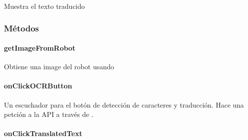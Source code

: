 \begin{fulllineitems}
\label{\detokenize{dev_docs:com.lar.cloudnao.OCRTranslationActivity.mTextTranslatedTV}}
Muestra el texto traducido

\end{fulllineitems}



\subsubsection{Métodos}
\label{\detokenize{dev_docs:id22}}

\paragraph{getImageFromRobot}
\label{\detokenize{dev_docs:id23}}

\begin{fulllineitems}
\label{\detokenize{dev_docs:com.lar.cloudnao.OCRTranslationActivity.getImageFromRobot()}}
Obtiene una image del robot usando 

\end{fulllineitems}



\paragraph{onClickOCRButton}
\label{\detokenize{dev_docs:onclickocrbutton}}

\begin{fulllineitems}
\label{\detokenize{dev_docs:com.lar.cloudnao.OCRTranslationActivity.onClickOCRButton()}}
Un escuchador para el botón de detección de caracteres y traducción. Hace una petción a la API a través de .

\end{fulllineitems}



\paragraph{onClickTranslatedText}
\label{\detokenize{dev_docs:onclicktranslatedtext}}

